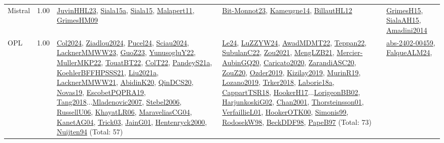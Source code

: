 {\begin{longtable}{p{3cm}r>{\raggedright\arraybackslash}p{6cm}>{\raggedright\arraybackslash}p{6cm}>{\raggedright\arraybackslash}p{8cm}}
\index{Mistral}\index{CPSystems!Mistral}Mistral &  1.00 & \hyperref[detail:JuvinHHL23]{JuvinHHL23}, \hyperref[detail:Siala15a]{Siala15a}, \hyperref[detail:Siala15]{Siala15}, \hyperref[detail:Malapert11]{Malapert11}, \hyperref[detail:GrimesHM09]{GrimesHM09} & \hyperref[detail:Bit-Monnot23]{Bit-Monnot23}, \hyperref[detail:Kameugne14]{Kameugne14}, \hyperref[detail:BillautHL12]{BillautHL12} & \hyperref[detail:GrimesH15]{GrimesH15}, \hyperref[detail:SialaAH15]{SialaAH15}, \hyperref[detail:Amadini2014]{Amadini2014}\\
\index{OPL}\index{CPSystems!OPL}OPL &  1.00 & \hyperref[detail:Col2024]{Col2024}, \hyperref[detail:Ziadlou2024]{Ziadlou2024}, \hyperref[detail:Pucel24]{Pucel24}, \hyperref[detail:Sciau2024]{Sciau2024}, \hyperref[detail:LacknerMMWW23]{LacknerMMWW23}, \hyperref[detail:GuoZ23]{GuoZ23}, \hyperref[detail:YunusogluY22]{YunusogluY22}, \hyperref[detail:MullerMKP22]{MullerMKP22}, \hyperref[detail:TouatBT22]{TouatBT22}, \hyperref[detail:ColT22]{ColT22}, \hyperref[detail:PandeyS21a]{PandeyS21a}, \hyperref[detail:KoehlerBFFHPSSS21]{KoehlerBFFHPSSS21}, \hyperref[detail:Liu2021a]{Liu2021a}, \hyperref[detail:LacknerMMWW21]{LacknerMMWW21}, \hyperref[detail:AbidinK20]{AbidinK20}, \hyperref[detail:QinDCS20]{QinDCS20}, \hyperref[detail:Novas19]{Novas19}, \hyperref[detail:EscobetPQPRA19]{EscobetPQPRA19}, \hyperref[detail:Tang2018]{Tang2018}...\hyperref[detail:Mladenovic2007]{Mladenovic2007}, \hyperref[detail:Stebel2006]{Stebel2006}, \hyperref[detail:RussellU06]{RussellU06}, \hyperref[detail:KhayatLR06]{KhayatLR06}, \hyperref[detail:MaraveliasCG04]{MaraveliasCG04}, \hyperref[detail:KanetAG04]{KanetAG04}, \hyperref[detail:Trick03]{Trick03}, \hyperref[detail:JainG01]{JainG01}, \hyperref[detail:Hentenryck2000]{Hentenryck2000}, \hyperref[detail:Nuijten94]{Nuijten94} (Total: 57) & \hyperref[detail:Le24]{Le24}, \hyperref[detail:LuZZYW24]{LuZZYW24}, \hyperref[detail:AwadMDMT22]{AwadMDMT22}, \hyperref[detail:Teppan22]{Teppan22}, \hyperref[detail:SubulanC22]{SubulanC22}, \hyperref[detail:Zou2021]{Zou2021}, \hyperref[detail:MengLZB21]{MengLZB21}, \hyperref[detail:Mercier-AubinGQ20]{Mercier-AubinGQ20}, \hyperref[detail:Caricato2020]{Caricato2020}, \hyperref[detail:ZarandiASC20]{ZarandiASC20}, \hyperref[detail:ZouZ20]{ZouZ20}, \hyperref[detail:Ozder2019]{Ozder2019}, \hyperref[detail:Kizilay2019]{Kizilay2019}, \hyperref[detail:MurinR19]{MurinR19}, \hyperref[detail:Lozano2019]{Lozano2019}, \hyperref[detail:Trker2018]{Trker2018}, \hyperref[detail:Laborie18a]{Laborie18a}, \hyperref[detail:CappartTSR18]{CappartTSR18}, \hyperref[detail:HookerH17]{HookerH17}...\hyperref[detail:LorigeonBB02]{LorigeonBB02}, \hyperref[detail:HarjunkoskiG02]{HarjunkoskiG02}, \hyperref[detail:Chan2001]{Chan2001}, \hyperref[detail:Thorsteinsson01]{Thorsteinsson01}, \hyperref[detail:VerfaillieL01]{VerfaillieL01}, \hyperref[detail:HookerOTK00]{HookerOTK00}, \hyperref[detail:Simonis99]{Simonis99}, \hyperref[detail:RodosekW98]{RodosekW98}, \hyperref[detail:BeckDDF98]{BeckDDF98}, \hyperref[detail:PapeB97]{PapeB97} (Total: 73) & \hyperref[detail:abs-2402-00459]{abs-2402-00459}, \hyperref[detail:FalqueALM24]{FalqueALM24}, 
\end{longtable}}
